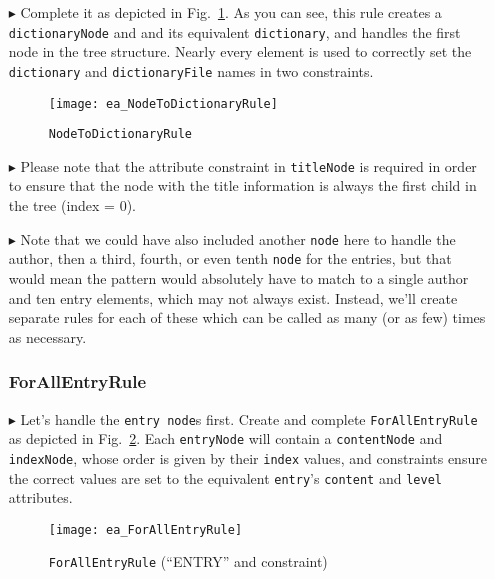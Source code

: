 \begin{itemize}
\item[$\blacktriangleright$] Complete it as depicted in Fig.~\ref{ea:NodeToDictionary_Complete}. As you can see, this rule creates a 
\texttt{dictionaryNode} and and its equivalent \texttt{dictionary}, and handles the first node in the tree structure. Nearly every
element is used to correctly set the \texttt{dictionary} and \texttt{dictionaryFile} names in two constraints.

\begin{figure}[htbp]
  \hspace{-0.7cm}
  \texttt{[image: ea\_NodeToDictionaryRule]}
  \caption{\texttt{NodeToDictionaryRule}}
  \label{ea:NodeToDictionary_Complete}
\end{figure}

\item[$\blacktriangleright$] Please note that the attribute constraint in \texttt{titleNode} is required in order to ensure that the node
with the title information is always the first child in the tree (index = 0). 

\item[$\blacktriangleright$] Note that we could have also included another \texttt{node} here to handle the author, then a third, fourth, or even tenth
\texttt{node} for the entries, but that would mean the pattern would absolutely have to match to a single author and ten entry elements, which
may not always exist. Instead, we'll create separate rules for each of these which can be called as many (or as few) times as necessary.

\subsubsection{ForAllEntryRule} %

\item[$\blacktriangleright$] Let's handle the \texttt{entry node}s first. Create and complete \texttt{For\-All\-Ent\-ry\-Rule} as depicted in
Fig.~\ref{ea:ForAllEntry_Complete}. Each \texttt{entryNode} will contain a \texttt{contentNode} and \texttt{indexNode}, whose order is given by their
\texttt{index} values, and constraints ensure the correct values are set to the equivalent \texttt{entry}'s \texttt{content} and \texttt{level} attributes.

\vspace{0.5cm}

\begin{figure}[htbp]
\begin{center}
  \texttt{[image: ea\_ForAllEntryRule]}
  \caption{\texttt{ForAllEntryRule} \update (``ENTRY'' and constraint)}
  \label{ea:ForAllEntry_Complete}
\end{center}
\end{figure}


\end{itemize}
